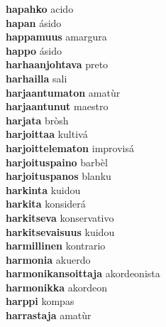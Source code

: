 \textbf{hapahko } acido \\
\textbf{hapan } ásido \\
\textbf{happamuus } amargura \\
\textbf{happo } ásido \\
\textbf{harhaanjohtava } preto \\
\textbf{harhailla } sali \\
\textbf{harjaantumaton } amatùr \\
\textbf{harjaantunut } maestro \\
\textbf{harjata } bròsh \\
\textbf{harjoittaa } kultivá \\
\textbf{harjoittelematon } improvisá \\
\textbf{harjoituspaino } barbèl \\
\textbf{harjoituspanos } blanku \\
\textbf{harkinta } kuidou \\
\textbf{harkita } konsiderá \\
\textbf{harkitseva } konservativo \\
\textbf{harkitsevaisuus } kuidou \\
\textbf{harmillinen } kontrario \\
\textbf{harmonia } akuerdo \\
\textbf{harmonikansoittaja } akordeonista \\
\textbf{harmonikka } akordeon \\
\textbf{harppi } kompas \\
\textbf{harrastaja } amatùr \\

